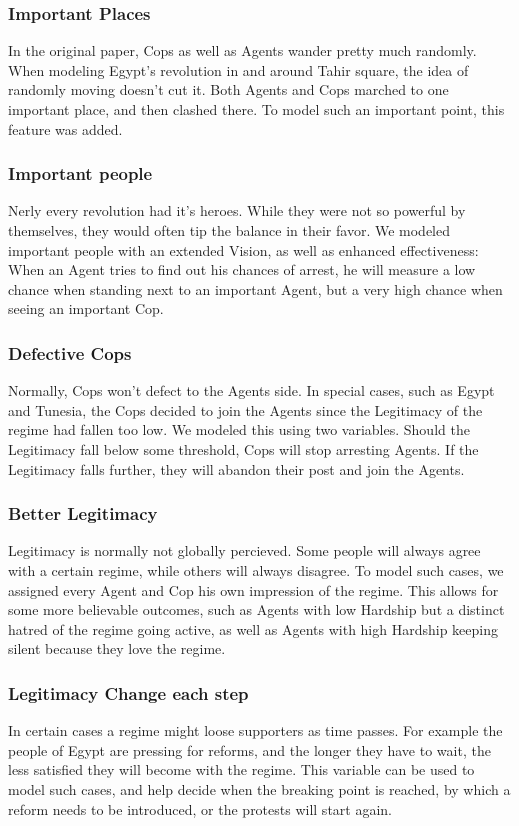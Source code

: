 \documentclass[11pt]{article}
\begin{document}
\subsubsection{Important Places}
In the original paper, Cops as well as Agents wander pretty much randomly. When modeling Egypt's revolution in and around Tahir square, the idea of randomly moving doesn't cut it. Both Agents and Cops marched to one important place, and then clashed there. To model such an important point, this feature was added.

\subsubsection{Important people}
Nerly every revolution had it's heroes. While they were not so powerful by themselves, they would often tip the balance in their favor. We modeled important people with an extended Vision, as well as enhanced effectiveness: When an Agent tries to find out his chances of arrest, he will measure a low chance when standing next to an important Agent, but a very high chance when seeing an important Cop.

\subsubsection{Defective Cops}
Normally, Cops won't defect to the Agents side. In special cases, such as Egypt and Tunesia, the Cops decided to join the Agents since the Legitimacy of the regime had fallen too low. We modeled this using two variables. Should the Legitimacy fall below some threshold, Cops will stop arresting Agents. If the Legitimacy falls further, they will abandon their post and join the Agents.

\subsubsection{Better Legitimacy}
Legitimacy is normally not globally percieved. Some people will always agree with a certain regime, while others will always disagree. To model such cases, we assigned every Agent and Cop his own impression of the regime. This allows for some more believable outcomes, such as Agents with low Hardship but a distinct hatred of the regime going active, as well as Agents with high Hardship keeping silent because they love the regime.

\subsubsection{Legitimacy Change each step}
In certain cases a regime might loose supporters as time passes. For example the people of Egypt are pressing for reforms, and the longer they have to wait, the less satisfied they will become with the regime. This variable can be used to model such cases, and help decide when the breaking point is reached, by which a reform needs to be introduced, or the protests will start again.
\end{document}
